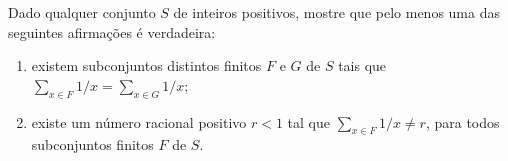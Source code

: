 Dado qualquer conjunto $S$ de inteiros positivos, mostre que pelo menos uma das seguintes afirmações é verdadeira:

\begin{enumerate}
	\item existem subconjuntos distintos finitos $F$ e $G$ de $S$ tais que $\sum_{x \in F} 1/x = \sum_{x \in G} 1/x$;

	\item existe um número racional positivo $r < 1$ tal que $\sum_{x \in F} 1/x \neq r$, para todos subconjuntos finitos $F$ de $S$.
\end{enumerate}
